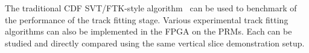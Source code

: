 


\noindent  
\noindent

The traditional CDF SVT/FTK-style algorithm~\cite{bib:Ann-09}  can be used to benchmark of the performance of the track fitting stage. Various experimental track fitting algorithms can also be implemented in the FPGA on the PRMs.  Each can be studied and directly compared using the same vertical slice demonstration setup.





